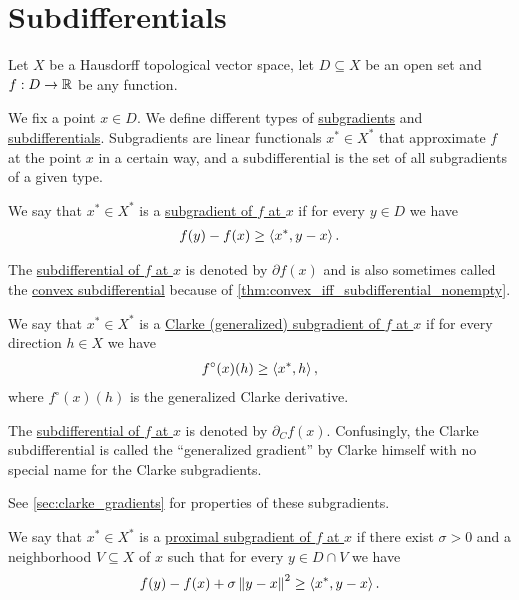 \section{Subdifferentials}\label{sec:subdifferentials}

Let $X$ be a Hausdorff topological vector space, let $D \subseteq X$ be an open set and $f: D \to \mathbb R$ be any function.

\begin{definition}\label{def:subdifferentials}
  We fix a point $x \in D$. We define different types of \ul{subgradients} and \ul{subdifferentials}. Subgradients are linear functionals $x^* \in X^*$ that approximate $f$ at the point $x$ in a certain way, and a subdifferential is the set of all subgradients of a given type.

  \begin{defenum}
    \item\label{def:subdifferentials/convex}\cite[59]{Clarke2013} We say that $x^* \in X^*$ is a \ul{subgradient of $f$ at $x$} if for every $y \in D$ we have
    \begin{align*}
      f(y) - f(x) \geq \left\langle x^*, y - x \right\rangle.
    \end{align*}

    The \ul{subdifferential of $f$ at $x$} is denoted by $\partial f(x)$ and is also sometimes called the \ul{convex subdifferential} because of \cref{thm:convex_iff_subdifferential_nonempty}.

    \item\label{def:subdifferentials/clarke}\cite[definition 10.3]{Clarke2013} We say that $x^* \in X^*$ is a \ul{Clarke (generalized) subgradient of $f$ at $x$} if for every direction $h \in X$ we have
    \begin{align*}
      f^\circ(x)(h) \geq \left\langle x^*, h \right\rangle,
    \end{align*}
    where $f^\circ(x)(h)$ is the generalized Clarke derivative.

    The \ul{subdifferential of $f$ at $x$} is denoted by $\partial_C f(x)$. Confusingly, the Clarke subdifferential is called the \enquote{generalized gradient} by Clarke himself with no special name for the Clarke subgradients.

    See \cref{sec:clarke_gradients} for properties of these subgradients.

    \item\label{def:subdifferentials/proximal}\cite[227]{Clarke2013} We say that $x^* \in X^*$ is a \ul{proximal subgradient of $f$ at $x$} if there exist $\sigma > 0$ and a neighborhood $V \subseteq X$ of $x$ such that for every $y \in D \cap V$ we have
    \begin{align*}
      f(y) - f(x) + \sigma \left\Vert y - x \right\Vert^2 \geq \left\langle x^*, y - x \right\rangle.
    \end{align*}


\end{defenum}
\end{definition}
